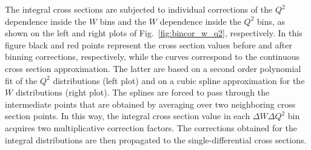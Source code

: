 
The integral cross sections are subjected to individual corrections of the $Q^{2}$ dependence inside the $W$ bins and the $W$ dependence inside the $Q^{2}$ bins, as shown on the left and right plots of Fig.~\ref{fig:bincor_w_q2}, respectively. In this figure black and red points represent the cross section values before and after binning corrections, respectively, while the curves correspond to the continuous cross section approximation. The latter are based on a second order polynomial fit of the $Q^{2}$ distributions (left plot) and on a cubic spline approximation for the $W$ distributions (right plot). The splines are forced to pass through the intermediate points that are obtained by averaging over two neighboring cross section points. In this way, the integral cross section value in each $\Delta W\Delta Q^{2}$ bin acquires two multiplicative correction factors. The corrections obtained for the integral distributions are then propagated to the single-differential cross sections.

